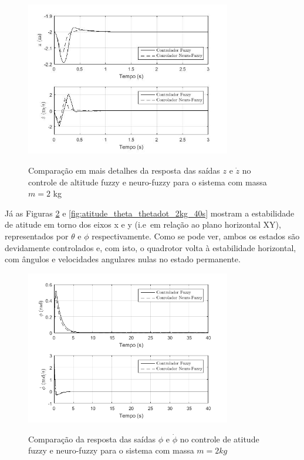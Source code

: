 \begin{figure}[!htb]
    \centering
    \caption{Comparação em mais detalhes da resposta das saídas $z$ e $\dot{z}$ no controle de altitude fuzzy e neuro-fuzzy para o sistema com massa $m=2$ kg}
    \includegraphics[width=0.8\textwidth]{./04-figuras/figuras_pos_banca/5-altitude2kg/graph_z_zdot_2kg_details}
    \label{fig:altitude_z_zdot_2kg_closer}
\end{figure}


Já as Figuras \ref{fig:atitude_phi_phidot_2kg_40s} e \ref{fig:atitude_theta_thetadot_2kg_40s} mostram a estabilidade de atitude em torno dos eixos x e y (i.e\ em relação ao plano horizontal XY), representados por $\theta$ e $\phi$ respectivamente. Como se pode ver, ambos os estados são devidamente controlados e, com isto, o quadrotor volta à estabilidade horizontal, com ângulos e velocidades angulares nulas no estado permanente.

\begin{figure}[!htb]
    \centering
    \caption{Comparação da resposta das saídas $\phi$ e $\dot{\phi}$ no controle de atitude fuzzy e neuro-fuzzy para o sistema com massa $m=2kg$}
    \includegraphics[width=0.8\textwidth]{./04-figuras/resultados/novos/atitude_phi_phidot_2kg_40s}
    \label{fig:atitude_phi_phidot_2kg_40s}
\end{figure}


